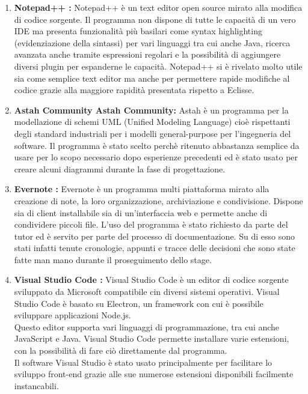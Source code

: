 \begin{enumerate}
\item \textbf{Notepad++ : } Notepad++ è un text editor \gls{open source} mirato alla modifica di codice sorgente. Il programma non dispone di tutte le capacità di un vero IDE ma presenta funzionalità più basilari come syntax highlighting (evidenziazione della sintassi) per 
vari linguaggi tra cui anche Java, ricerca avanzata anche tramite espressioni regolari e la possibilità di aggiungere diversi plugin per espanderne le capacità.
Notepad++ si è rivelato molto utile sia come semplice text editor ma anche per permettere rapide modifiche al codice grazie alla maggiore rapidità presentata rispetto a Eclisse.

\item \textbf{Astah Community Astah Community: } Astah è un programma per la modellazione di schemi UML (Unified Modeling Language) cioè rispettanti degli standard industriali per i modelli general-purpose per l'ingegneria del software.
Il programma è stato scelto perchè ritenuto abbastanza semplice da usare per lo scopo necessario dopo esperienze precedenti ed è stato usato per creare alcuni diagrammi durante la fase di progettazione.

\item \textbf{Evernote :} Evernote è un programma multi piattaforma mirato alla creazione di note, la loro organizzazione, archiviazione e condivisione. Dispone sia di client installabile sia di un'interfaccia web e permette anche di condividere piccoli file.
L'uso del programma è stato richiesto da parte del tutor ed è servito per parte del processo di documentazione. Su di esso sono stati infatti tenute cronologie, appunti e tracce delle decisioni che sono state fatte man mano durante il proseguimento dello stage.

\item \textbf{Visual Studio Code :}
Visual Studio Code è un editor di codice sorgente sviluppato da Microsoft compatibile cin diversi sistemi operativi.
Visual Studio Code è basato su Electron, un \gls{framework} con cui è possibile sviluppare applicazioni Node.js.\\
Questo editor supporta vari linguaggi di programmazione, tra cui anche JavaScript e Java.
Visual Studio Code permette installare varie estensioni, con la possibilità di fare ciò direttamente dal programma. \\
Il software Visual Studio è stato usato principalmente per facilitare lo sviluppo front-end grazie alle sue numerose estensioni disponibili facilmente instancabili. 


\end{enumerate}
